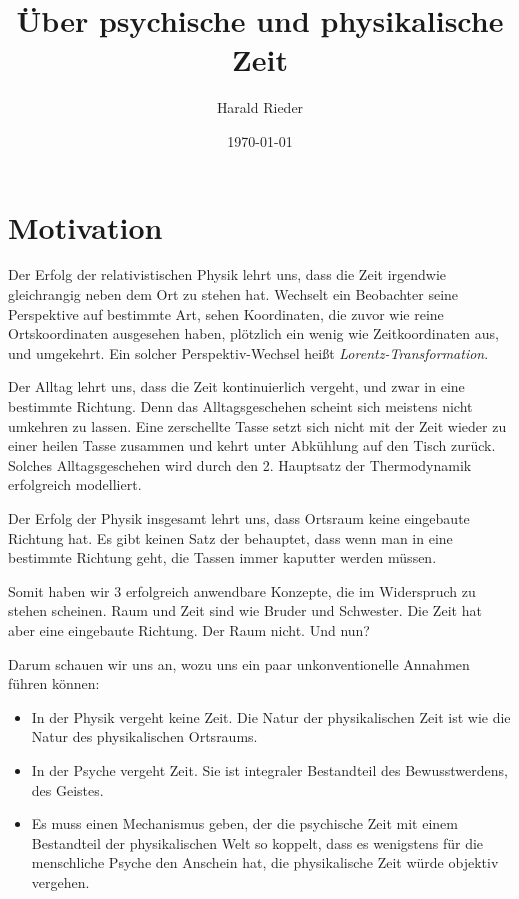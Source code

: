 \documentclass[12pt]{article}
\begin{document}
\title{\fontsize{25}{25}\selectfont \textbf{Über psychische und physikalische Zeit}}
\author{Harald Rieder}
\date{\today}
\maketitle



\tableofcontents

\section{Motivation}

Der Erfolg der relativistischen Physik lehrt uns, dass die Zeit irgendwie gleichrangig neben dem Ort zu stehen hat. Wechselt ein Beobachter seine Perspektive auf bestimmte Art, sehen  Koordinaten, die zuvor wie reine Ortskoordinaten ausgesehen haben, plötzlich ein wenig wie Zeitkoordinaten aus, und umgekehrt. Ein solcher Perspektiv-Wechsel heißt \emph{Lorentz-Transformation}. 

Der Alltag lehrt uns, dass die Zeit kontinuierlich vergeht, und zwar in eine bestimmte Richtung. Denn das Alltagsgeschehen scheint sich meistens nicht umkehren zu lassen. Eine zerschellte Tasse setzt sich nicht mit der Zeit wieder zu einer heilen Tasse zusammen und kehrt unter Abkühlung auf den Tisch zurück. Solches Alltagsgeschehen wird durch den 2. Hauptsatz der Thermodynamik erfolgreich modelliert.

Der Erfolg der Physik insgesamt lehrt uns, dass Ortsraum keine eingebaute Richtung hat. Es gibt keinen Satz der behauptet, dass wenn man in eine bestimmte Richtung geht, die Tassen immer kaputter werden müssen.

Somit haben wir 3 erfolgreich anwendbare Konzepte, die im Widerspruch zu stehen scheinen. Raum und Zeit sind wie Bruder und Schwester. Die Zeit hat aber eine eingebaute Richtung. Der Raum nicht. Und nun?

Darum schauen wir uns an, wozu uns ein paar unkonventionelle Annahmen führen können:

\begin{itemize}
\item In der Physik vergeht keine Zeit. Die Natur der physikalischen Zeit ist wie die Natur des physikalischen Ortsraums.
\item In der Psyche vergeht Zeit. Sie ist integraler Bestandteil des Bewusstwerdens, des Geistes. 
\item Es muss einen Mechanismus geben, der die psychische Zeit mit einem Bestandteil der physikalischen Welt so koppelt, dass es wenigstens für die menschliche Psyche den Anschein hat, die physikalische Zeit würde objektiv vergehen.
\end{itemize}
\end{document}

